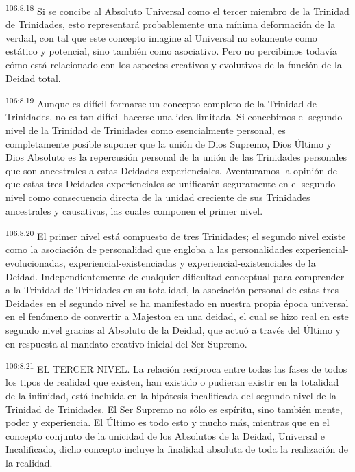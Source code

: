 \par
\textsuperscript{106:8.18} Si se concibe al Absoluto Universal como el tercer miembro de la Trinidad de Trinidades, esto representará probablemente una mínima deformación de la verdad, con tal que este concepto imagine al Universal no solamente como estático y potencial, sino también como asociativo. Pero no percibimos todavía cómo está relacionado con los aspectos creativos y evolutivos de la función de la Deidad total.

\par
\textsuperscript{106:8.19} Aunque es difícil formarse un concepto completo de la Trinidad de Trinidades, no es tan difícil hacerse una idea limitada. Si concebimos el segundo nivel de la Trinidad de Trinidades como esencialmente personal, es completamente posible suponer que la unión de Dios Supremo, Dios Último y Dios Absoluto es la repercusión personal de la unión de las Trinidades personales que son ancestrales a estas Deidades experienciales. Aventuramos la opinión de que estas tres Deidades experienciales se unificarán seguramente en el segundo nivel como consecuencia directa de la unidad creciente de sus Trinidades ancestrales y causativas, las cuales componen el primer nivel.

\par
\textsuperscript{106:8.20} El primer nivel está compuesto de tres Trinidades; el segundo nivel existe como la asociación de personalidad que engloba a las personalidades experiencial-evolucionadas, experiencial-existenciadas y experiencial-existenciales de la Deidad. Independientemente de cualquier dificultad conceptual para comprender a la Trinidad de Trinidades en su totalidad, la asociación personal de estas tres Deidades en el segundo nivel se ha manifestado en nuestra propia época universal en el fenómeno de convertir a Majeston en una deidad, el cual se hizo real en este segundo nivel gracias al Absoluto de la Deidad, que actuó a través del Último y en respuesta al mandato creativo inicial del Ser Supremo.

\par
\textsuperscript{106:8.21} EL TERCER NIVEL. La relación recíproca entre todas las fases de todos los tipos de realidad que existen, han existido o pudieran existir en la totalidad de la infinidad, está incluida en la hipótesis incalificada del segundo nivel de la Trinidad de Trinidades. El Ser Supremo no sólo es espíritu, sino también mente, poder y experiencia. El Último es todo esto y mucho más, mientras que en el concepto conjunto de la unicidad de los Absolutos de la Deidad, Universal e Incalificado, dicho concepto incluye la finalidad absoluta de toda la realización de la realidad.

